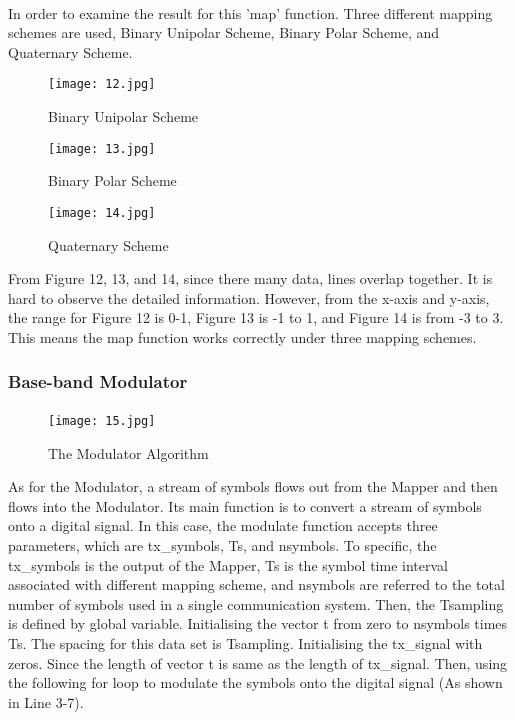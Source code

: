 \documentclass[12pt]{article}
\begin{document}
    \paragraph{}
    In order to examine the result for this 'map' function. Three different mapping schemes are used, Binary Unipolar Scheme, Binary Polar Scheme, and Quaternary Scheme.
    \begin{figure}[htbp]
    \begin{minipage}[t]{0.3\linewidth}
    \centering
    \texttt{[image: 12.jpg]}
    \caption{Binary Unipolar Scheme}
    \label{fig:side:a}
    \end{minipage}
    \begin{minipage}[t]{0.3\linewidth}
    \centering
    \texttt{[image: 13.jpg]}
    \caption{Binary Polar Scheme}
    \end{minipage}
    \begin{minipage}[t]{0.3\linewidth}
    \centering
    \texttt{[image: 14.jpg]}
    \caption{Quaternary Scheme}
    \label{}
    \end{minipage}
    \end{figure}
    From Figure 12, 13, and 14, since there many data, lines overlap together. It is hard to observe the detailed information. However, from the x-axis and y-axis, the range for Figure 12 is 0-1, Figure 13 is -1 to 1, and Figure 14 is from -3 to 3. This means the map function works correctly under three mapping schemes.
    
    
    
    
    
    \subsubsection{Base-band Modulator}
    \paragraph{}
    \begin{figure}[H]
    \centering
    \texttt{[image: 15.jpg]}
    \caption{The Modulator Algorithm}
    \end{figure}
    As for the Modulator, a stream of symbols flows out from the Mapper and then flows into the Modulator. Its main function is to convert a stream of symbols onto a digital signal. In this case, the modulate function accepts three parameters, which are tx\_symbols, Ts, and nsymbols. To specific, the tx\_symbols is the output of the Mapper, Ts is the symbol time interval associated with different mapping scheme, and nsymbols are referred to the total number of symbols used in a single communication system. Then, the Tsampling is defined by global variable. Initialising the vector t from zero to nsymbols times Ts. The spacing for this data set is Tsampling. Initialising the tx\_signal with zeros. Since the length of vector t is same as the length of tx\_signal. Then, using the following for loop to modulate the symbols onto the digital signal (As shown in Line 3-7).
\end{document}
